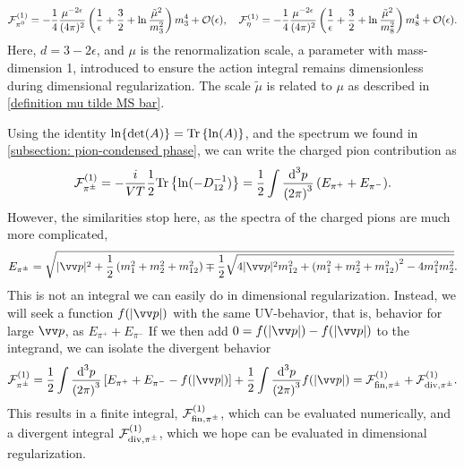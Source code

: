 %
\begin{equation}
    \label{Free energy pi 0}
    \mathcal{F}^{(1)}_{\pi^0} 
    = 
    -  \frac{1}{4} \frac{ \mu^{-2 \epsilon}}{(4\pi)^2}
    \left( \frac{1}{\epsilon} + \frac{3}{2} + \ln \frac{\tilde \mu^2}{m_3^2} \right)
    m_3^4
    + \mathcal{O}(\epsilon), \quad
    \mathcal{F}^{(1)}_{\eta}
    = 
    - \frac{1}{4} \frac{\mu^{-2 \epsilon}}{(4\pi)^2} 
    \left( \frac{1}{\epsilon} + \frac{3}{2} + \ln \frac{\tilde \mu^2}{m_8^2} \right)
    m_8^4
    + \mathcal{O}(\epsilon).
\end{equation}
%
Here, $d = 3 - 2\epsilon$, and $\mu$ is the renormalization scale, a parameter with mass-dimension 1, introduced to ensure the action integral remains dimensionless during dimensional regularization. The scale $\tilde \mu$ is related to $\mu$ as described in \autoref{definition mu tilde MS bar}.

Using the identity $\ln\{\det(A)\} = \text{Tr} \left\{ \ln(A) \right\}$, and the spectrum we found in \autoref{subsection: pion-condensed phase}, we can write the charged pion contribution as
%
\begin{equation}
    \mathcal{F}_{\pi^\pm}^{(1)}
    = - \frac{i}{VT}\frac{1}{2}\text{Tr} \left\{ \ln(-D_{12}^{-1}) \right\}
    =
    \frac{1}{2} \int  \frac{\text{d}^3 p}{{(2\pi)}^3 } \, (E_{\pi^+} + E_{\pi^-}).
\end{equation}
%
However, the similarities stop here, as the spectra of the charged pions are much more complicated,
%
\begin{equation}
    E_{\pi^\pm}
    = 
    \sqrt{
        |\vv p|^2 +
        \frac{1}{2}
        \left(
            m_1^2 + m_2^2 + m_{12}^2 
        \right)
        \mp 
        \frac{1}{2}
        \sqrt{
            4|\vv p|^2m_{12}^2 
            +
            \left(
                m_1^2 + m_2^2 + m_{12}^2
            \right)^2
            - 4 m_1^2 m_2^2
        }
    }.
\end{equation}
%
This is not an integral we can easily do in dimensional regularization.
Instead, we will seek a function $f(|\vv p|)$ with the same UV-behavior, that is, behavior for large $\vv p$, as $E_{\pi^+} + E_{\pi^-}$
If we then add $0 = f(|\vv p|) - f(|\vv p|)$ to the integrand, we can isolate the divergent behavior
%
\begin{equation}
    \Eff_{\pi^\pm}^{(1)}
    = 
    \frac{1}{2} \int \frac{\dd^3 p}{{(2\pi)}^3} 
    \left[E_{\pi^+} + E_{\pi^- } - f(|\vv p|)\right]
    + \frac{1}{2} \int \frac{\dd^3 p}{{(2\pi)}^3} f(|\vv p|)
    = \Eff^{(1)}_{\mathrm{fin}, \pipm } + \Eff^{(1)}_{\mathrm{div}, \pipm}.
\end{equation}
%
This results in a finite integral, $\mathcal{F}^{(1)}_{\mathrm{fin}, {\pi^\pm} }$, which can be evaluated numerically, and a divergent integral $\mathcal{F}^{(1)}_{\mathrm{div}, {\pi^\pm} }$, which we hope can be evaluated in dimensional regularization.

